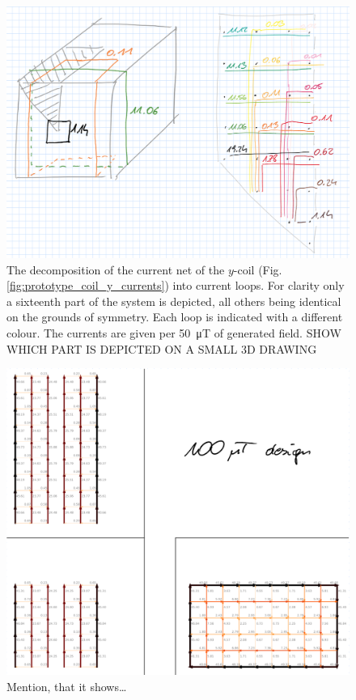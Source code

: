 \begin{figure}
  \centering
  \includegraphics[width=0.9\linewidth]{gfx/prototype/coil_y_decomposition.png}
  \caption{The decomposition of the current net of the $y$-coil (Fig.\,\ref{fig:prototype_coil_y_currents}) into current loops. For clarity only a sixteenth part of the system is depicted, all others being identical on the grounds of symmetry. Each loop is indicated with a different colour. The currents are given per \SI{50}{\micro\tesla} of generated field. SHOW WHICH PART IS DEPICTED ON A SMALL 3D DRAWING}
  \label{fig:prototype_coil_y_decomposition}
\end{figure}

\begin{figure}
  \centering
  \includegraphics[width=0.9\linewidth]{gfx/prototype/coil_x_z_currents.png}
  \caption{Mention, that it shows\ldots}
  \label{fig:prototype_coil_x_z_currents}
\end{figure}

